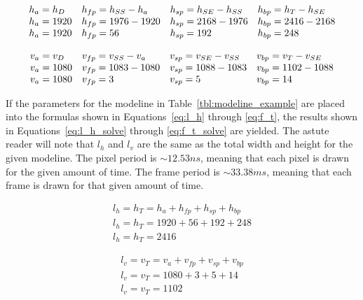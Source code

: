     \begin{equation}
        \begin{array}{ l l l l }
            \displaystyle
            h_a=h_D & h_{fp}=h_{SS}-h_a & h_{sp}=h_{SE}-h_{SS} & h_{bp}=h_T-h_{SE} \\
            h_a=1920 & h_{fp}=1976-1920 & h_{sp}=2168-1976 & h_{bp}=2416-2168 \\
            h_a=1920 & h_{fp}=56 & h_{sp}=192 & h_{bp}=248
        \end{array}
        \label{eq:h_a_solve}
    \end{equation}

    \begin{equation}
        \begin{array}{ l l l l }
            \displaystyle
            v_a=v_D & v_{fp}=v_{SS}-v_a & v_{sp}=v_{SE}-v_{SS} & v_{bp}=v_T-v_{SE} \\
            v_a=1080 & v_{fp}=1083-1080 & v_{sp}=1088-1083 & v_{bp}=1102-1088 \\
            v_a=1080 & v_{fp}=3 & v_{sp}=5 & v_{bp}=14
        \end{array}
        \label{eq:v_a_solve}
    \end{equation}

    If the parameters for the modeline in Table~\ref{tbl:modeline_example} are placed into the formulas shown in Equations~\eqref{eq:l_h} through \eqref{eq:f_t}, the results shown in Equations~\eqref{eq:l_h_solve} through \eqref{eq:f_t_solve} are yielded. The astute reader will note that $l_h$ and $l_v$ are the same as the total width and height for the given modeline. The pixel period is $\sim12.53 ns$, meaning that each pixel is drawn for the given amount of time. The frame period is $\sim33.38 ms$, meaning that each frame is drawn for that given amount of time.

    \begin{equation}
        \begin{array}{ l }
            \displaystyle l_h=h_T=h_a+h_{fp}+h_{sp}+h_{bp} \\
            \displaystyle l_h=h_T=1920+56+192+248 \\
            \displaystyle l_h=h_T=2416
            \label{eq:l_h_solve}
        \end{array}
    \end{equation}

    \begin{equation}
        \begin{array}{ l }
            \displaystyle l_v=v_T=v_a+v_{fp}+v_{sp}+v_{bp} \\
            \displaystyle l_v=v_T=1080+3+5+14 \\
            \displaystyle l_v=v_T=1102 \\[11pt]
        \end{array}
        \label{eq:l_v_solve}
    \end{equation}

